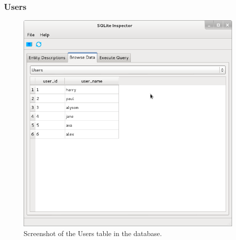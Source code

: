 \documentclass[a4paper]{article}
\begin{document}
        \subsubsection{Users}
            \begin{figure}[H]
                \caption{Screenshot of the Users table in the database.}
                \centering
                \includegraphics[scale=0.5]{../shared_assets/screenshots/database_users.png}
            \end{figure}
\end{document}
